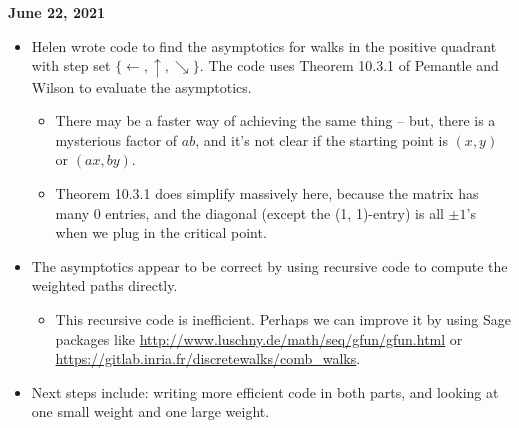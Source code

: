 \documentclass[letterpaper]{article}
\begin{document}
{\bf June 22, 2021}
\begin{itemize}
\item Helen wrote code to find the asymptotics for walks in the positive quadrant with step set $\{\leftarrow, \uparrow, \searrow\}$.  The code uses Theorem 10.3.1 of Pemantle and Wilson to evaluate the asymptotics.
\begin{itemize}
\item There may be a faster way of achieving the same thing -- but, there is a mysterious factor of $ab$, and it's not clear if the starting point is $(x, y)$ or $(ax, by)$.
\item Theorem 10.3.1 does simplify massively here, because the matrix has many 0 entries, and the diagonal (except the (1, 1)-entry) is all $\pm1$'s when we plug in the critical point.
\end{itemize}
\item The asymptotics appear to be correct by using recursive code to compute the weighted paths directly.
\begin{itemize}
\item This recursive code is inefficient.  Perhaps we can improve it by using Sage packages like \url{http://www.luschny.de/math/seq/gfun/gfun.html} or \url{https://gitlab.inria.fr/discretewalks/comb_walks}.
\end{itemize}
\item Next steps include: writing more efficient code in both parts, and looking at one small weight and one large weight.
\end{itemize}
\end{document}

